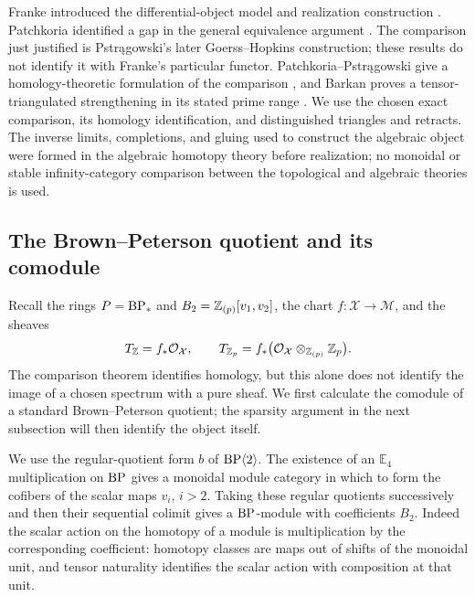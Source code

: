 Franke introduced the differential-object model and realization
construction \cite[Section~2.2 and Theorem~10 of Section~3.5]{Franke1996}.
Patchkoria identified a gap in the general equivalence argument
\cite[Remark~6.3.1]{Patchkoria2011}. The comparison just justified is
Pstr\k{a}gowski's later Goerss--Hopkins construction; these results
do not identify it with Franke's particular functor.
Patchkoria--Pstr\k{a}gowski give a homology-theoretic formulation of
the comparison \cite[Theorems~7.56 and~8.13]{PP2023}, and Barkan proves
a tensor-triangulated strengthening in its stated prime range
\cite[Theorem~1.1 and Corollary~3.42]{Barkan2023}. We use the chosen
exact comparison, its homology identification, and distinguished
triangles and retracts. The inverse limits, completions, and gluing
used to construct the algebraic object were formed in the algebraic
homotopy theory before realization; no monoidal or stable
infinity-category comparison between the topological and algebraic
theories is used.

\subsection{The Brown--Peterson quotient and its comodule}

Recall the rings $P=\mathrm{BP}_*$ and $B_2=\mathbb Z_{(p)}[v_1,v_2]$, the chart
$f:\mathcal X\to\mathcal M$, and the sheaves
\[
 T_{\mathbb Z}=f_*\mathcal O_{\mathcal X},\qquad
 T_{\mathbb Z_p}=f_*\bigl(\mathcal O_{\mathcal X}
                  \otimes_{\mathbb Z_{(p)}}\mathbb Z_p\bigr).
\]
The comparison theorem identifies homology, but this alone does not
identify the image of a chosen spectrum with a pure sheaf. We first
calculate the comodule of a standard Brown--Peterson quotient; the
sparsity argument in the next subsection will then identify the
object itself.

We use the regular-quotient form $b$ of $\mathrm{BP}\langle2\rangle$.
The existence of an $\mathbb E_4$ multiplication on $\mathrm{BP}$
\cite[Theorem~1.1 and Corollary~1.2]{BM2013} gives a monoidal module
category in which to form the cofibers of the scalar maps $v_i$, $i>2$.
Taking these regular quotients
successively and then their sequential colimit gives a $\mathrm{BP}$-module
with coefficients $B_2$. Indeed the scalar action on the homotopy of a
module is multiplication by the corresponding coefficient: homotopy
classes are maps out of shifts of the monoidal unit, and tensor
naturality identifies the scalar action with composition at that unit.

